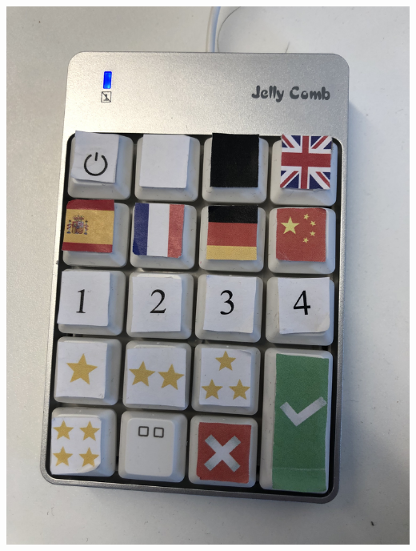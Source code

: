 \documentclass[onecolumn]{IEEEtran}
\begin{document}
\begin{center}
\begin{minipage}[c]{.45\textwidth}
  \includegraphics[scale = .05]{numpad}
   \label{fig:numpad}
\end{minipage}
\end{center}

\hspace{1cm}
\end{document}
